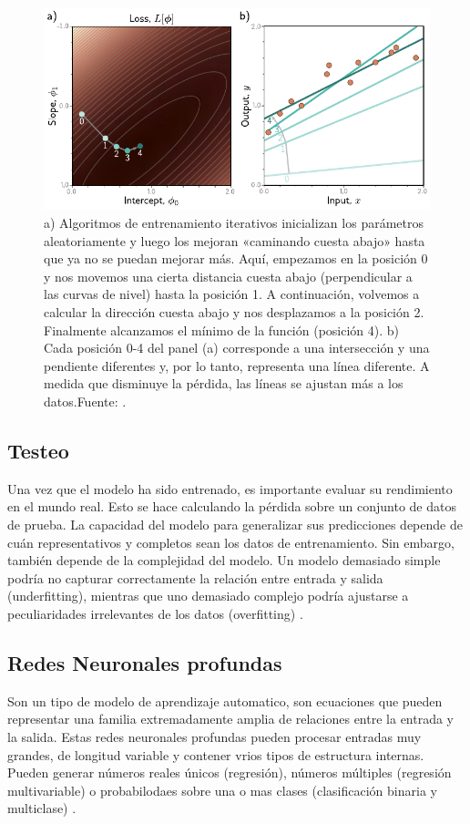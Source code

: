 	\begin{figure}[h!]
		\centering
		\includegraphics[width=0.7\linewidth]{graficos/loss2}
		\caption[Ajuste de la función de perdida en el entrenamiento.]{a) Algoritmos de entrenamiento iterativos inicializan los parámetros aleatoriamente y luego los mejoran «caminando cuesta abajo» hasta que ya no se puedan mejorar más. Aquí, empezamos en la posición 0 y nos movemos una cierta distancia cuesta abajo (perpendicular a las curvas de nivel) hasta la posición 1. A continuación, volvemos a calcular la dirección cuesta abajo y nos desplazamos a la posición 2. Finalmente alcanzamos el mínimo de la función (posición 4). b) Cada posición 0-4 del panel (a) corresponde a una intersección y una pendiente diferentes y, por lo tanto, representa una línea diferente. A medida que disminuye la pérdida, las líneas se ajustan más a los datos.Fuente: \parencite{prince2023understanding}.}
		\label{fig:loss2}
	\end{figure}
	
	\subsection{Testeo}
	Una vez que el modelo ha sido entrenado, es importante evaluar su rendimiento en el mundo real. Esto se hace calculando la pérdida sobre un conjunto de datos de prueba. La capacidad del modelo para generalizar sus predicciones depende de cuán representativos y completos sean los datos de entrenamiento. Sin embargo, también depende de la complejidad del modelo. Un modelo demasiado simple podría no capturar correctamente la relación entre entrada y salida (underfitting), mientras que uno demasiado complejo podría ajustarse a peculiaridades irrelevantes de los datos (overfitting) \parencite{prince2023understanding}.
	
	\subsection{Redes Neuronales profundas}
	Son un tipo de modelo de aprendizaje automatico, son ecuaciones que pueden representar una familia extremadamente amplia de relaciones entre la entrada y la salida. Estas redes neuronales profundas pueden procesar entradas muy grandes, de longitud variable y contener vrios tipos de estructura internas. Pueden generar números reales únicos (regresión), números múltiples (regresión multivariable) o probabilodaes sobre una o mas clases (clasificación binaria y multiclase) \parencite{prince2023understanding}. 
	

